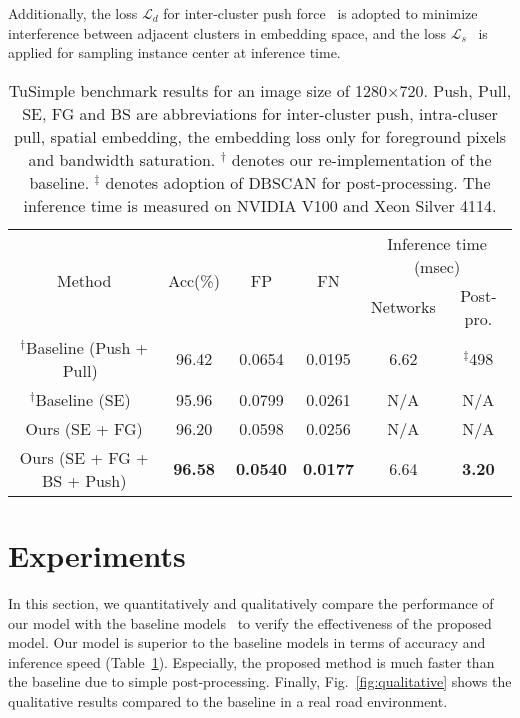 \documentclass[runningheads]{llncs}
\newcommand{\drule}{\specialrule{0.2pt}{1pt}{1pt}\specialrule{0.2pt}{0pt}{\belowrulesep}}
\begin{document}
Additionally, the loss $\mathcal{L}_d$ for inter-cluster push force~\cite{de2017semantic} is adopted to minimize interference between adjacent clusters in embedding space, and the loss $\mathcal{L}_s$~\cite{neven2019instance} is applied for sampling instance center at inference time.











\begin{table}[b!]
\vspace*{-0.65cm}
\begin{center}
\footnotesize
\renewcommand{\tabcolsep}{1.0mm}
\begin{tabular}{c|c|c|c|c|c}
\toprule
\multirow{2}{*}{Method} & \multirow{2}{*}{Acc(\%)} & \multirow{2}{*}{FP} & \multirow{2}{*}{FN} & \multicolumn{2}{c}{Inference time (msec)}\\
& & & & Networks & Post-pro. \\ 
\drule
$^\dagger$Baseline (Push + Pull)~\cite{neven2018towards} & 96.42 & 0.0654 & 0.0195 & 6.62 & $^\ddagger$498\\
\midrule
$^\dagger$Baseline (SE)~\cite{neven2019instance} & 95.96 & 0.0799 & 0.0261 & N/A & N/A\\
\midrule
Ours (SE + FG) & 96.20 & 0.0598 & 0.0256 & N/A & N/A \\
\midrule
Ours (SE + FG + BS + Push) & \textbf{96.58} & \textbf{0.0540} & \textbf{0.0177} & 6.64 & \textbf{3.20} \\
\bottomrule
\end{tabular}
\end{center}
\vspace*{-0.2cm}
\caption{TuSimple benchmark results for an image size of 1280$\times$720. Push, Pull, SE, FG and BS are abbreviations for inter-cluster push, intra-cluser pull, spatial embedding, the embedding loss only for foreground pixels and bandwidth saturation. $^\dagger$ denotes our re-implementation of the baseline. $^\ddagger$ denotes adoption of DBSCAN for post-processing. The inference time is measured on NVIDIA V100 and Xeon Silver 4114.}
\label{tab_best_model}
\end{table}

\vspace*{-0.4cm}
\section{Experiments}
\vspace*{-0.25cm}
In this section, we quantitatively and qualitatively compare the performance of our model with the baseline models~\cite{neven2018towards,neven2019instance} to verify the effectiveness of the proposed model. Our model is superior to the baseline models in terms of accuracy and inference speed (Table~\ref{tab_best_model}). Especially, the proposed method is much faster than the baseline due to simple post-processing. Finally, Fig.~\ref{fig:qualitative} shows the qualitative results compared to the baseline in a real road environment.
\end{document}
